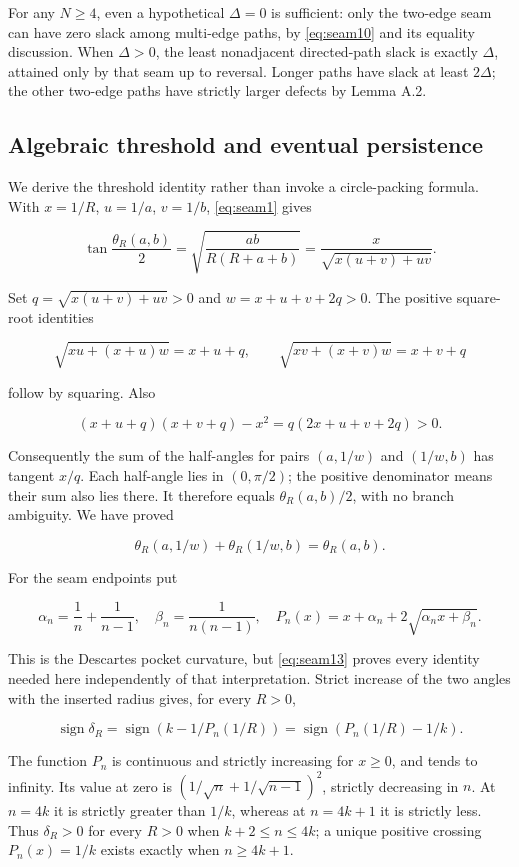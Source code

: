 For any $N\ge4$, even a hypothetical $\Delta=0$ is sufficient:
only the two-edge seam can have zero slack among multi-edge paths, by \eqref{eq:seam10}
and its equality discussion. When $\Delta>0$, the least nonadjacent
directed-path slack is exactly $\Delta$, attained only by that seam
up to reversal. Longer paths have slack at least $2\Delta$; the other
two-edge paths have strictly larger defects by Lemma A.2.

\subsection{Algebraic threshold and eventual persistence}

We derive the threshold identity rather than invoke a circle-packing
formula. With $x=1/R$, $u=1/a$, $v=1/b$, \eqref{eq:seam1} gives

\[
 \tan\frac{\theta_R(a,b)}2
 =\sqrt{\frac{ab}{R(R+a+b)}}=\frac{x}{\sqrt{x(u+v)+uv}}.
 \tag{A.12}\label{eq:seam12}
\]

Set $q=\sqrt{x(u+v)+uv}>0$ and $w=x+u+v+2q>0$. The positive
square-root identities

\[
 \sqrt{xu+(x+u)w}=x+u+q,\qquad
 \sqrt{xv+(x+v)w}=x+v+q
\]

follow by squaring. Also

\[
 (x+u+q)(x+v+q)-x^2=q(2x+u+v+2q)>0.
\]

Consequently the sum of the half-angles for pairs $(a,1/w)$ and
$(1/w,b)$ has tangent $x/q$. Each half-angle lies in
$(0,\pi/2)$; the positive denominator means their sum also lies
there. It therefore equals $\theta_R(a,b)/2$, with no branch
ambiguity. We have proved

\[
 \theta_R(a,1/w)+\theta_R(1/w,b)=\theta_R(a,b).
 \tag{A.13}\label{eq:seam13}
\]

For the seam endpoints put

\[
 \alpha_n=\frac1n+\frac1{n-1},\quad \beta_n=\frac1{n(n-1)},\quad
 P_n(x)=x+\alpha_n+2\sqrt{\alpha_n x+\beta_n}.
 \tag{A.14}\label{eq:seam14}
\]

This is the Descartes pocket curvature, but \eqref{eq:seam13} proves every identity
needed here independently of that interpretation. Strict increase of the
two angles with the inserted radius gives, for every $R>0$,

\[
 \operatorname{sign}\delta_R
 =\operatorname{sign}(k-1/P_n(1/R))
 =\operatorname{sign}(P_n(1/R)-1/k). \tag{A.15}\label{eq:seam15}
\]

The function $P_n$ is continuous and strictly increasing for $x\ge0$,
and tends to infinity. Its value at zero is
$(1/\sqrt n+1/\sqrt{n-1})^2$, strictly decreasing in $n$.
At $n=4k$ it is strictly greater than $1/k$, whereas at
$n=4k+1$ it is strictly less. Thus $\delta_R>0$ for every
$R>0$ when $k+2\le n\le4k$; a unique positive crossing
$P_n(x)=1/k$ exists exactly when $n\ge4k+1$.

